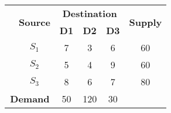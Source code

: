 \begin{tabular}{|c|c|c|c|c|c|}
\hline
\multirow{2}{*}{} & \multirow{2}{*}{\textbf{Source}} & \multicolumn{3}{c|}{\textbf{Destination}} & \multirow{2}{*}{\textbf{Supply}} \\
\cline{3-5}
 & & \textbf{D1} & \textbf{D2} & \textbf{D3} & \\
\hline
 & $S_1$ & 7 & 3 & 6 & 60 \\
\hline
 & $S_2$ & 5 & 4 & 9 & 60 \\
\hline
 & $S_3$ & 8 & 6 & 7 & 80 \\
\hline
\multicolumn{2}{|c|}{\textbf{Demand}} & 50 & 120 & 30 & \\
\hline
\end{tabular}